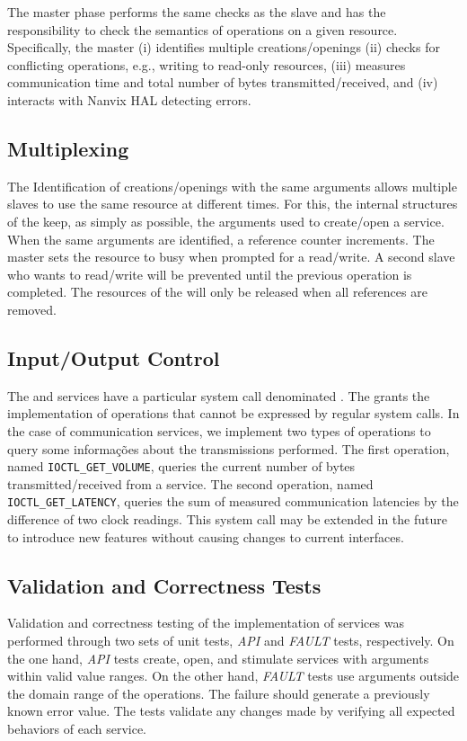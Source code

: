 			The master phase performs the same checks as the slave and has the
			responsibility to check the semantics of operations on a given resource.
			Specifically, the master
			(i) identifies multiple creations/openings
			(ii) checks for conflicting operations, e.g., writing to read-only resources,
			(iii) measures communication time and total number of bytes transmitted/received, and
			(iv) interacts with Nanvix HAL detecting errors.

		\subsection{Multiplexing}

			The Identification of creations/openings with the same arguments
			allows multiple slaves to use the same resource at different times.
			For this, the internal structures of the \os keep, as simply as possible,
			the arguments used to create/open a service. When the same arguments are
			identified, a reference counter increments. The master sets the resource
			to busy when prompted for a read/write. A second slave who wants to read/write
			 will be prevented until the previous operation is completed. The resources
			 of the \hal will only be released when all references are removed.

		\subsection{Input/Output Control}

			The \mailbox and \portal services have a particular system call denominated
			\ioctl. The \ioctl grants the implementation of operations that cannot be
			expressed by regular system calls. In the case of communication services,
			we implement two types of operations to query some informações about the
			transmissions performed. The first operation, named \texttt{IOCTL\_GET\_VOLUME},
			queries the current number of bytes transmitted/received from a service.
			The second operation, named \texttt{IOCTL\_GET\_LATENCY}, queries the sum
			of measured communication latencies by the difference of two clock readings.
			This system call may be extended in the future to introduce new features
			without causing changes to current interfaces.

		\subsection{Validation and Correctness Tests}

			Validation and correctness testing of the implementation of services was
			performed through two sets of unit tests, \textit{API} and \textit{FAULT}
			tests, respectively. On the one hand, \textit{API} tests create, open, and
			stimulate services with arguments within valid value ranges. On the other
			hand, \textit{FAULT} tests use arguments outside the domain range of the
			operations. The failure should generate a previously known error value.
			The tests validate any changes made by verifying all expected behaviors
			of each service.
